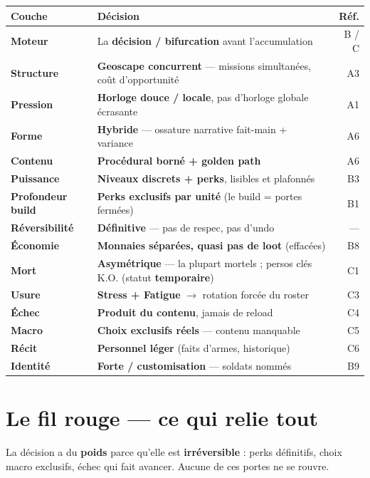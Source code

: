 \documentclass[11pt,a4paper]{article}
\begin{document}
\renewcommand{\arraystretch}{1.3}
\begin{tabularx}{\linewidth}{@{}>{\bfseries}p{3.1cm} X r@{}}
\toprule
\textmd{\textbf{Couche}} & \textbf{Décision} & \textbf{Réf.} \\
\midrule
Moteur & La \textbf{décision / bifurcation} avant l'accumulation & B / C \\
Structure & \textbf{Geoscape concurrent} --- missions simultanées, coût d'opportunité & A3 \\
Pression & \textbf{Horloge douce / locale}, pas d'horloge globale écrasante & A1 \\
Forme & \textbf{Hybride} --- ossature narrative fait-main + variance & A6 \\
Contenu & \textbf{Procédural borné + golden path} & A6 \\
Puissance & \textbf{Niveaux discrets + perks}, lisibles et plafonnés & B3 \\
Profondeur build & \textbf{Perks exclusifs par unité} (le build = portes fermées) & B1 \\
Réversibilité & \textbf{Définitive} --- pas de respec, pas d'undo & --- \\
Économie & \textbf{Monnaies séparées, quasi pas de loot} (effacées) & B8 \\
Mort & \textbf{Asymétrique} --- la plupart mortels ; persos clés K.O. (statut \textbf{temporaire}) & C1 \\
Usure & \textbf{Stress + Fatigue} $\rightarrow$ rotation forcée du roster & C3 \\
Échec & \textbf{Produit du contenu}, jamais de reload & C4 \\
Macro & \textbf{Choix exclusifs réels} --- contenu manquable & C5 \\
Récit & \textbf{Personnel léger} (faits d'armes, historique) & C6 \\
Identité & \textbf{Forte / customisation} --- soldats nommés & B9 \\
\bottomrule
\end{tabularx}
\renewcommand{\arraystretch}{1}

\section{Le fil rouge --- ce qui relie tout}

La décision a du \textbf{poids} parce qu'elle est \textbf{irréversible} : perks définitifs, choix macro exclusifs, échec qui fait avancer. Aucune de ces portes ne se rouvre.
\end{document}
